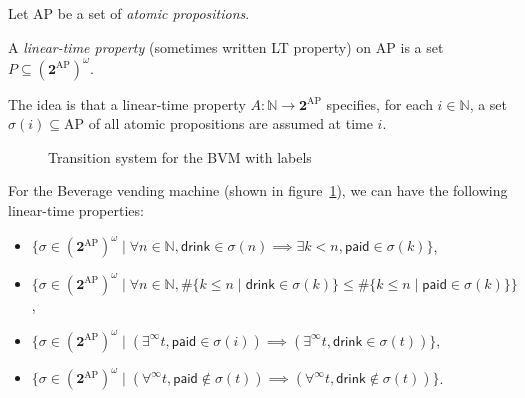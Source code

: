 \documentclass[./main]{subfiles}
\begin{document}
  Let $\mathrm{AP}$ be a set of \textit{atomic propositions}.

  \begin{defn}
    A \textit{linear-time property} (sometimes written LT property) on $\mathrm{AP}$ is a set $P \subseteq (\mathbf{2}^\mathrm{AP})^\omega$.
  \end{defn}
  
  The idea is that a linear-time property $A : \mathds{N} \to \mathbf{2}^\mathrm{AP}$ specifies, for each $i \in \mathds{N}$, a set $\sigma(i) \subseteq \mathrm{AP}$ of all atomic propositions are assumed at time $i$.

  \begin{figure}
    \centering
    \caption{Transition system for the BVM with labels}
    \label{fig:bvm-ts-label}
  \end{figure}

  \begin{exm}
    \label{exm:BVM-LTProp}
    For the Beverage vending machine (shown in figure~\ref{fig:bvm-ts-label}), we can have the following linear-time properties:
    \scriptsize
    \begin{itemize}
      \item $\{\sigma \in (\mathbf{2}^\mathrm{AP})^\omega \mid \forall n \in \mathds{N}, \mathsf{drink} \in \sigma(n) \implies\exists k < n, \mathsf{paid} \in \sigma(k) \}$,
      \item $\{\sigma \in (\mathbf{2}^\mathrm{AP})^\omega  \mid \forall n \in \mathds{N}, \#\{k \le n  \mid \mathsf{drink} \in \sigma(k)\} \le \# \{k \le n  \mid \mathsf{paid} \in \sigma(k)\} \} $,
      \item $\{\sigma \in (\mathbf{2}^\mathrm{AP})^\omega  \mid (\exists^\infty t, \mathsf{paid} \in \sigma(i)) \implies(\exists^\infty t, \mathsf{drink} \in \sigma(t)) \} $,
      \item $\{\sigma \in (\mathbf{2}^\mathrm{AP})^\omega \mid (\forall^\infty t, \mathsf{paid} \not\in \sigma(t)) \implies (\forall^\infty t, \mathsf{drink} \not\in \sigma(t)) \} $.
    \end{itemize}
  \end{exm}
\end{document}
